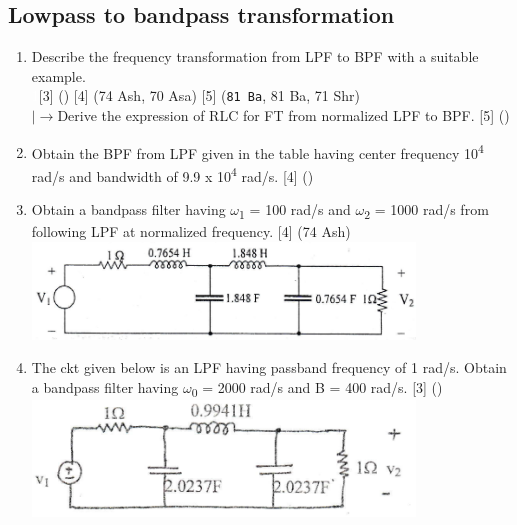 \documentclass[12pt]{article}
\newcommand{\w}{\(\omega\)}
\newcommand{\lb}{\\$\left|\rightarrow\right.$}
\newcommand{\enter}{\\\textcolor{white}{1}}
\newcommand{\sub}[1]{\textsubscript{#1}}
\begin{document}
	\subsection{Lowpass to bandpass transformation}
		\begin{enumerate}
			\item Describe the frequency transformation from LPF to BPF with a suitable example.
			\enter \hfill [3] () [4] (74 Ash, 70 Asa) [5] (\texttt{81 Ba}, 81 Ba, 71 Shr)
			\lb Derive the expression of RLC for FT from normalized LPF to BPF. \hfill [5] ()
			
			\item Obtain the BPF from LPF given in the table having center frequency 10\textsuperscript{4} rad/s and bandwidth of 9.9 x 10\textsuperscript{4} rad/s. \hfill[4] ()
			
			\item Obtain a bandpass filter having \w\sub{1} = 100 rad/s and \w\sub{2} = 1000 rad/s from following LPF at normalized frequency. \hfill [4] (74 Ash)\\
			\includegraphics[width=4in]{./pics/fd_8}
			
			\item The ckt given below is an LPF having passband frequency of 1 rad/s. Obtain a bandpass filter having \w\sub{0} = 2000 rad/s and B = 400 rad/s. \hfill [3] ()\\
			\includegraphics[width=4in]{./pics/fd_10}
		\end{enumerate}
\end{document}
